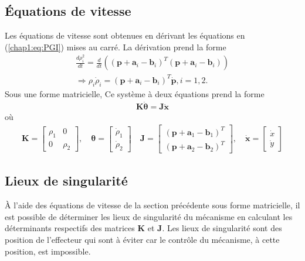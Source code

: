 \subsection{Équations de vitesse}
Les équations de vitesse sont obtenues en dérivant les équations en (\ref{chap1:eq:PGI}) mises au carré. La dérivation prend la forme
\begin{align}
\frac{d\rho_i^2}{dt}=\frac{d}{dt}\left(\left(\mathbf{p} + \mathbf{a}_i-\mathbf{b}_i\right)^T\left(\mathbf{p} + \mathbf{a}_i-\mathbf{b}_i\right)\right)\\
\Rightarrow\rho_i\dot{\rho}_i = \left(\mathbf{p} + \mathbf{a}_i-\mathbf{b}_i\right)^T\dot{\mathbf{p}}, i=1,2.
\end{align}
Sous une forme matricielle, Ce système à deux équations prend la forme
\begin{align}
\mathbf{K}\dot{\bm{\theta}}=\mathbf{J}\dot{\mathbf{x}}
\end{align}
où
\begin{align}
\mathbf{K} = \begin{bmatrix}
\rho_1 & 0\\0 & \rho_2
\end{bmatrix},\quad 
\bm{\theta} =\begin{bmatrix}
 \dot{\rho}_1\\
 \dot{\rho}_2
 \end{bmatrix}
 \quad
 \mathbf{J}=
 \begin{bmatrix}
 \left(\mathbf{p} + \mathbf{a}_1-\mathbf{b}_1\right)^T \\
 \left(\mathbf{p} + \mathbf{a}_2-\mathbf{b}_2\right)^T
\end{bmatrix},\quad
\dot{\mathbf{x}}=
\begin{bmatrix}
\dot{x}\\
\dot{y}
\end{bmatrix}
\end{align}
\subsection{Lieux de singularité}
À l'aide des équations de vitesse de la section précédente sous forme matricielle, il est possible de déterminer les lieux de singularité du mécanisme en calculant les déterminants respectifs des matrices $\mathbf{K}$ et $\mathbf{J}$. Les lieux de singularité sont des position de l'effecteur qui sont à éviter car le contrôle du mécanisme, à cette position, est impossible. 

